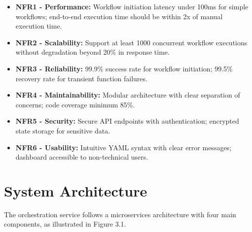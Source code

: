 \documentclass{fisatprojectfinal}
\begin{document}
\begin{itemize}
    \item \textbf{NFR1 - Performance:} Workflow initiation latency under 100ms for simple workflows; end-to-end execution time should be within 2x of manual execution time.
    
    \item \textbf{NFR2 - Scalability:} Support at least 1000 concurrent workflow executions without degradation beyond 20\% in response time.
    
    \item \textbf{NFR3 - Reliability:} 99.9\% success rate for workflow initiation; 99.5\% recovery rate for transient function failures.
    
    \item \textbf{NFR4 - Maintainability:} Modular architecture with clear separation of concerns; code coverage minimum 85\%.
    
    \item \textbf{NFR5 - Security:} Secure API endpoints with authentication; encrypted state storage for sensitive data.
    
    \item \textbf{NFR6 - Usability:} Intuitive YAML syntax with clear error messages; dashboard accessible to non-technical users.
\end{itemize}

\section{System Architecture}
The orchestration service follows a microservices architecture with four main components, as illustrated in Figure 3.1.
\end{document}
